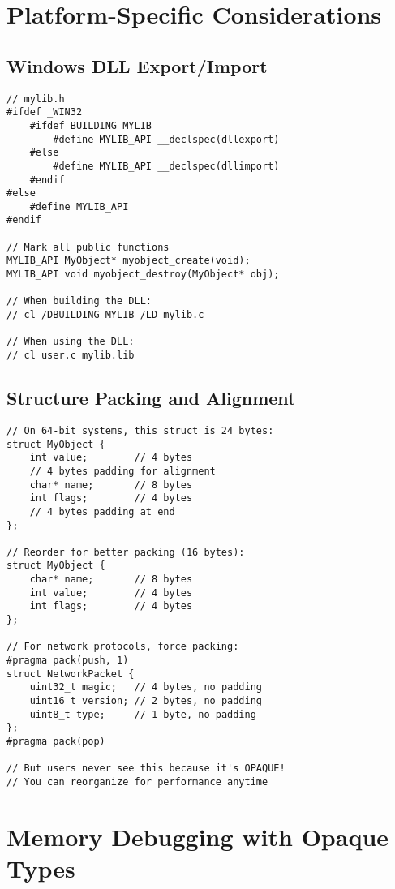 \section{Platform-Specific Considerations}

\subsection{Windows DLL Export/Import}

\begin{lstlisting}
// mylib.h
#ifdef _WIN32
    #ifdef BUILDING_MYLIB
        #define MYLIB_API __declspec(dllexport)
    #else
        #define MYLIB_API __declspec(dllimport)
    #endif
#else
    #define MYLIB_API
#endif

// Mark all public functions
MYLIB_API MyObject* myobject_create(void);
MYLIB_API void myobject_destroy(MyObject* obj);

// When building the DLL:
// cl /DBUILDING_MYLIB /LD mylib.c

// When using the DLL:
// cl user.c mylib.lib
\end{lstlisting}

\subsection{Structure Packing and Alignment}

\begin{lstlisting}
// On 64-bit systems, this struct is 24 bytes:
struct MyObject {
    int value;        // 4 bytes
    // 4 bytes padding for alignment
    char* name;       // 8 bytes
    int flags;        // 4 bytes
    // 4 bytes padding at end
};

// Reorder for better packing (16 bytes):
struct MyObject {
    char* name;       // 8 bytes
    int value;        // 4 bytes
    int flags;        // 4 bytes
};

// For network protocols, force packing:
#pragma pack(push, 1)
struct NetworkPacket {
    uint32_t magic;   // 4 bytes, no padding
    uint16_t version; // 2 bytes, no padding
    uint8_t type;     // 1 byte, no padding
};
#pragma pack(pop)

// But users never see this because it's OPAQUE!
// You can reorganize for performance anytime
\end{lstlisting}

\section{Memory Debugging with Opaque Types}

